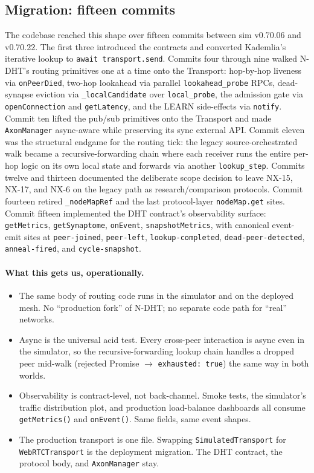 \documentclass[twoside,nobib]{tufte-book}
\newcommand{\NDHT}{N-DHT\xspace}
\begin{document}
\subsection{Migration: fifteen commits}

The codebase reached this shape over fifteen commits between
sim v0.70.06 and v0.70.22. The first three introduced the
contracts and converted Kademlia's iterative lookup to
\texttt{await transport.send}. Commits four through nine walked
\NDHT's routing primitives one at a time onto the Transport:
hop-by-hop liveness via \texttt{onPeerDied}, two-hop lookahead
via parallel \texttt{lookahead\_probe} RPCs, dead-synapse
eviction via \texttt{\_localCandidate} over
\texttt{local\_probe}, the admission gate via
\texttt{openConnection} and \texttt{getLatency}, and the LEARN
side-effects via \texttt{notify}. Commit ten lifted the pub/sub
primitives onto the Transport and made \texttt{AxonManager}
async-aware while preserving its sync external API. Commit
eleven was the structural endgame for the routing tick: the
legacy source-orchestrated walk became a recursive-forwarding
chain where each receiver runs the entire per-hop logic on its
own local state and forwards via another
\texttt{lookup\_step}. Commits twelve and thirteen documented
the deliberate scope decision to leave NX-15, NX-17, and NX-6
on the legacy path as research/comparison protocols. Commit
fourteen retired \texttt{\_nodeMapRef} and the last
protocol-layer \texttt{nodeMap.get} sites. Commit fifteen
implemented the DHT contract's observability surface:
\texttt{getMetrics}, \texttt{getSynaptome}, \texttt{onEvent},
\texttt{snapshotMetrics}, with canonical event-emit sites at
\texttt{peer-joined}, \texttt{peer-left},
\texttt{lookup-completed}, \texttt{dead-peer-detected},
\texttt{anneal-fired}, and \texttt{cycle-snapshot}.

\paragraph{What this gets us, operationally.}

\begin{itemize}\itemsep2pt
\item The same body of routing code runs in the simulator and
  on the deployed mesh. No ``production fork'' of \NDHT; no
  separate code path for ``real'' networks.
\item Async is the universal acid test. Every cross-peer
  interaction is async even in the simulator, so the
  recursive-forwarding lookup chain handles a dropped peer
  mid-walk (rejected Promise $\rightarrow$ \texttt{exhausted:
  true}) the same way in both worlds.
\item Observability is contract-level, not back-channel. Smoke
  tests, the simulator's traffic distribution plot, and
  production load-balance dashboards all consume
  \texttt{getMetrics()} and \texttt{onEvent()}. Same fields,
  same event shapes.
\item The production transport is one file. Swapping
  \texttt{SimulatedTransport} for \texttt{WebRTCTransport} is
  the deployment migration. The DHT contract, the protocol
  body, and \texttt{AxonManager} stay.
\end{itemize}
\end{document}
